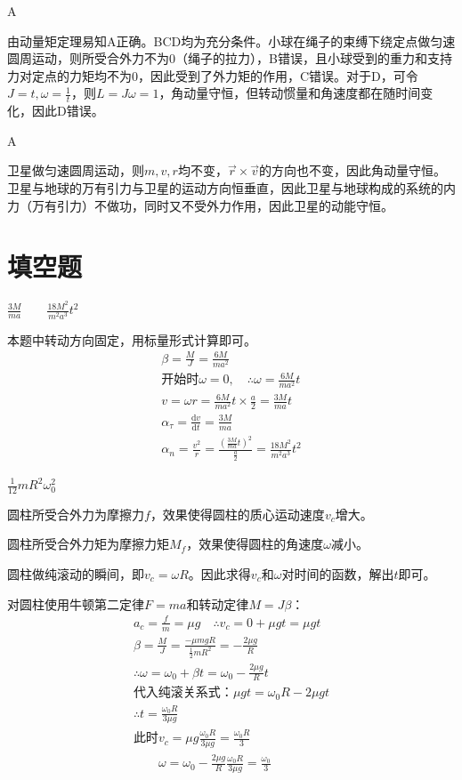 \documentclass[b5paper,opensource,sourcefont,parskip]{qyxf-book}
\newcommand{\di}[1]{\mathrm{d}#1}
\newcommand{\dy}[2]{\frac{\di{#1}}{\di{#2}}}
\begin{document}
A

\solve 由动量矩定理易知A正确。BCD均为充分条件。小球在绳子的束缚下绕定点做匀速圆周运动，则所受合外力不为0（绳子的拉力），B错误，且小球受到的重力和支持力对定点的力矩均不为0，因此受到了外力矩的作用，C错误。对于D，可令$ J=t,\omega=\frac{1}{t} $，则$ L=J\omega=1 $，角动量守恒，但转动惯量和角速度都在随时间变化，因此D错误。
			
A

\solve 卫星做匀速圆周运动，则$ m,v,r $均不变，$ \vec{r}\times\vec{v} $的方向也不变，因此角动量守恒。卫星与地球的万有引力与卫星的运动方向恒垂直，因此卫星与地球构成的系统的内力（万有引力）不做功，同时又不受外力作用，因此卫星的动能守恒。

\section{填空题}
$\frac{3M}{ma} \hspace{2em} \frac{18M^2}{m^2a^3}t^2$

\solve 本题中转动方向固定，用标量形式计算即可。
\begin{gather*}
\beta=\frac{M}{J}=\frac{6M}{ma^2}\\
\text{开始时}\omega=0,\quad\therefore \omega=\frac{6M}{ma^2}t\\
v=\omega r=\frac{6M}{ma^2}t\times\frac{a}{2}=\frac{3M}{ma}t\\
\alpha_{\tau}=\dy{v}{t}=\frac{3M}{ma}\\
\alpha_n=\frac{v^2}{r}=\frac{\left(\frac{3M}{ma}t\right)^2}{\frac{a}{2}}=\frac{18M^2}{m^2a^3}t^2
\end{gather*}

$\frac{1}{12}mR^2\omega_0^2$

\solve 圆柱所受合外力为摩擦力$f$，效果使得圆柱的质心运动速度$ v_c $增大。

圆柱所受合外力矩为摩擦力矩$ M_f $，效果使得圆柱的角速度$ \omega $减小。

圆柱做纯滚动的瞬间，即$ v_c=\omega R $。因此求得$ v_c $和$ \omega $对时间的函数，解出$ t $即可。

对圆柱使用牛顿第二定律$F=ma$和转动定律$M=J\beta$：
\begin{gather*}
a_c=\frac{f}{m}=\mu g\quad\therefore v_c=0+\mu gt=\mu gt\\
\beta=\frac{M}{J}=\frac{-\mu mgR}{\frac{1}{2}mR^2}=-\frac{2\mu g}{R}\\
\therefore \omega=\omega_0+\beta t=\omega_0-\frac{2\mu g}{R}t\\
\text{代入纯滚关系式：}\mu gt=\omega_0R-2\mu gt\\
\therefore t=\frac{\omega_0R}{3\mu g}\\
\text{此时}v_c=\mu g\frac{\omega_0R}{3\mu g}=\frac{\omega_0R}{3}\\
\hspace{2em}\omega=\omega_0-\frac{2\mu g}{R}\frac{\omega_0R}{3\mu g}=\frac{\omega_0}{3}
\end{gather*}
\end{document}
